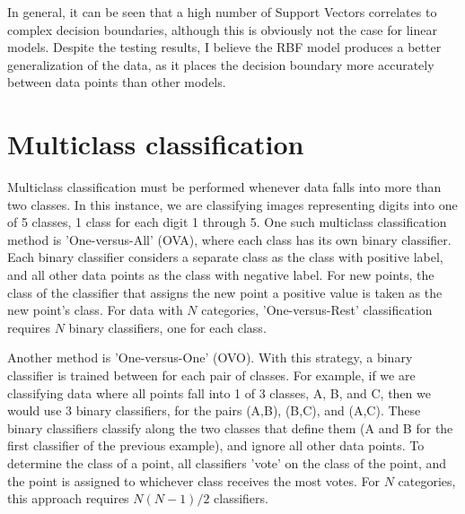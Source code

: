 \documentclass[a4paper]{article}
\begin{document}
In general, it can be seen that a high number of Support Vectors correlates to complex decision boundaries, although this is obviously not the case for linear models.  Despite the testing results, I believe the RBF model produces a better generalization of the data, as it places the decision boundary more accurately between data points than other models.
\clearpage

\section{Multiclass classification}

Multiclass classification must be performed whenever data falls into more than two classes.  In this instance, we are classifying images representing digits into one of 5 classes, 1 class for each digit 1 through 5.  One such multiclass classification method is 'One-versus-All' (OVA), where each class has its own binary classifier.  Each binary classifier considers a separate class as the class with positive label, and all other data points as the class with negative label.  For new points, the class of the classifier that assigns the new point a positive value is taken as the new point's class.  For data with $N$ categories, 'One-versus-Rest' classification requires $N$ binary classifiers, one for each class.

Another method is 'One-versus-One' (OVO).  With this strategy, a binary classifier is trained between for each pair of classes.  For example, if we are classifying data where all points fall into 1 of 3 classes, A, B, and C, then we would use 3 binary classifiers, for the pairs (A,B), (B,C), and (A,C).  These binary classifiers classify along the two classes that define them (A and B for the first classifier of the previous example), and ignore all other data points.  To determine the class of a point, all classifiers 'vote' on the class of the point, and the point is assigned to whichever class receives the most votes.  For $N$ categories, this approach requires $N(N-1)/2$ classifiers.
\end{document}
